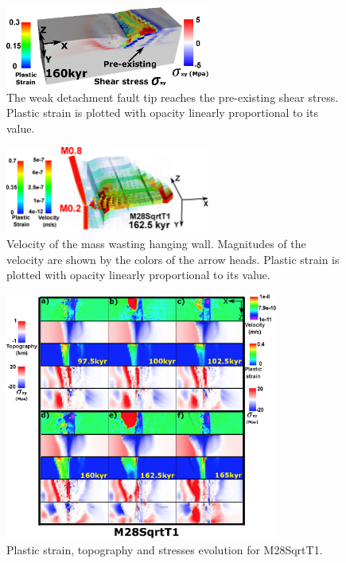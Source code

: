 
\begin{figure}[h]
  \centering
    \includegraphics[width=0.6\textwidth]{./Figures/fig_Results4_5_sqrt_cut_back_pre_accummulated_shear_zone.eps}
  \caption{The weak detachment fault tip reaches the pre-existing shear stress. Plastic strain is plotted with opacity linearly proportional to its value.}
 \label{fig_Results4_5}
\end{figure}   

\begin{figure}[h]
  \centering
    \includegraphics[width=0.6\textwidth]{./Figures/fig_Results_3_2_5_Cut-back_velocity.eps}
  \caption{Velocity of the mass wasting hanging wall. Magnitudes of the velocity are shown by the colors of the arrow heads. Plastic strain is plotted with opacity linearly proportional to its value.}
 \label{fig_Results_3_2_5_Cut-back_velocity}
\end{figure}   

\begin{figure}[h]
  \centering
    \includegraphics[width=0.8\textwidth]{./Figures/fig_Results4_4_sqrt_cut_back_with_time_1.eps}
  \caption{Plastic strain, topography and stresses evolution for M28SqrtT1.}
 \label{fig_Results4_4}
\end{figure}   

